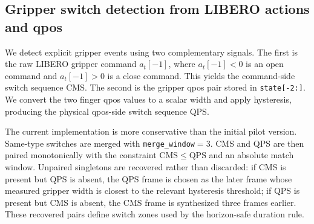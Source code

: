 \documentclass[10pt,twocolumn,letterpaper]{article}
\begin{document}
\subsection{Gripper switch detection from LIBERO actions and qpos}
\label{app:gripper-switch-code}
We detect explicit gripper events using two complementary signals. The first is the raw LIBERO gripper command $a_t[-1]$, where $a_t[-1]<0$ is an open command and $a_t[-1]>0$ is a close command. This yields the command-side switch sequence CMS. The second is the gripper qpos pair stored in \texttt{state[-2:]}. We convert the two finger qpos values to a scalar width and apply hysteresis, producing the physical qpos-side switch sequence QPS.

The current implementation is more conservative than the initial pilot version. Same-type switches are merged with \texttt{merge\_window}$=3$. CMS and QPS are then paired monotonically with the constraint $\mathrm{CMS}\le\mathrm{QPS}$ and an absolute match window. Unpaired singletons are recovered rather than discarded: if CMS is present but QPS is absent, the QPS frame is chosen as the later frame whose measured gripper width is closest to the relevant hysteresis threshold; if QPS is present but CMS is absent, the CMS frame is synthesized three frames earlier. These recovered pairs define switch zones used by the horizon-safe duration rule.
\end{document}
